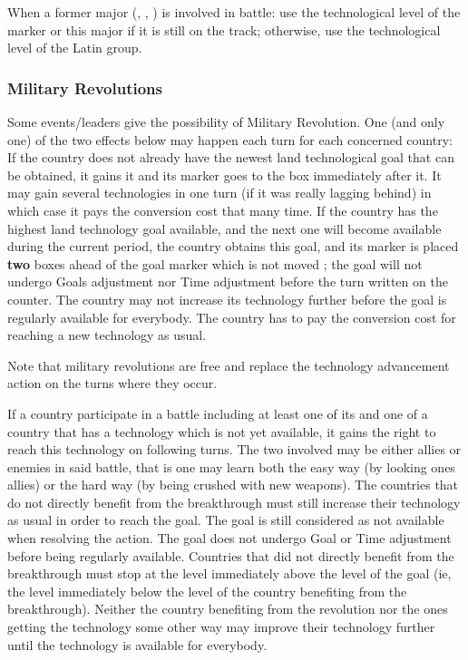 \aparag When a former major (\paysPortugal, \paysVenise, \paysPologne) is
involved in battle:
\bparag use the technological level of the marker or this major if it is still
on the track;
\bparag otherwise, use the technological level of the Latin group.


\subsubsection{Military Revolutions}\label{chAdministration:Military Revolutions}
\aparag Some events/leaders give the possibility of Military Revolution. One
(and only one) of the two effects below may happen each turn for each
concerned country:
\bparag[Catching up] If the country does not already have the newest land
technological goal that can be obtained, it gains it and its marker goes to
the box immediately after it. It may gain several technologies in one turn (if
it was really lagging behind) in which case it pays the conversion cost that
many time.
\bparag[Breakthrough] If the country has the highest land technology goal
available, and the next one will become available during the current period,
the country obtains this goal, and its marker is placed \textbf{two} boxes
ahead of the goal marker which is not moved ; the goal will not undergo Goals
adjustment nor Time adjustment before the turn written on the counter. The
country may not increase its technology further before the goal is regularly
available for everybody. The country has to pay the conversion cost for
reaching a new technology as usual.

\aparag Note that military revolutions are free and replace the technology
advancement action on the turns where they occur.

 If a country participate in a battle including
at least one of its \ARMY and one \ARMY of a country that has a technology
which is not yet available, it gains the right to reach this technology on
following turns.
\aparag The two \ARMY involved may be either allies or enemies in said battle,
that is one may learn both the easy way (by looking ones allies) or the hard
way (by being crushed with new weapons).
\bparag The countries that do not directly benefit from the breakthrough must
still increase their technology as usual in order to reach the goal.
\bparag The goal is still considered as not available when resolving the
action.
\bparag The goal does not undergo Goal or Time adjustment before being
regularly available.
\bparag Countries that did not directly benefit from the breakthrough must
stop at the level immediately above the level of the goal (ie, the level
immediately below the level of the country benefiting from the breakthrough).
\bparag Neither the country benefiting from the revolution nor the ones
getting the technology some other way may improve their technology further
until the technology is available for everybody.


